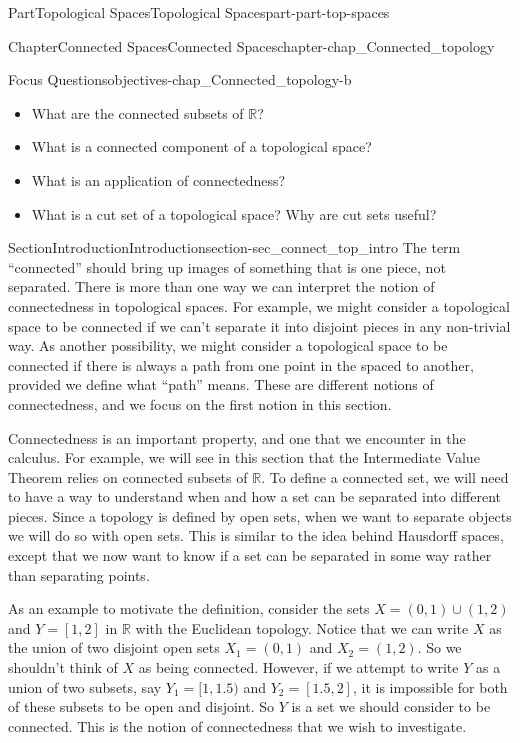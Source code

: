\documentclass[oneside,10pt,]{book}
\numberwithin{equation}{chapter}
\newcommand{\R}{\mathbb{R}}
\begin{document}
\begin{partptx}{Part}{Topological Spaces}{}{Topological Spaces}{}{}{part-part-top-spaces}
\begin{chapterptx}{Chapter}{Connected Spaces}{}{Connected Spaces}{}{}{chapter-chap_Connected_topology}
\begin{objectives}{Focus Questions}{objectives-chap_Connected_topology-b}
\begin{itemize}[label=\textbullet]
\item{}What are the connected subsets of \(\R\)?%
\item{}What is a connected component of a topological space?%
\item{}What is an application of connectedness?%
\item{}What is a cut set of a topological space? Why are cut sets useful?%
\end{itemize}
\end{objectives}
%
%
\typeout{************************************************}
\typeout{************************************************}
%
\begin{sectionptx}{Section}{Introduction}{}{Introduction}{}{}{section-sec_connect_top_intro}
The term ``connected'' should bring up images of something that is one piece, not separated. There is more than one way we can interpret the notion of connectedness in topological spaces. For example, we might consider a topological space to be connected if we can't separate it into disjoint pieces in any non-trivial way. As another possibility, we might consider a topological space to be connected if there is always a path from one point in the spaced to another, provided we define what ``path'' means. These are different notions of connectedness, and we focus on the first notion in this section.%
\par
Connectedness is an important property, and one that we encounter in the calculus. For example, we will see in this section that the Intermediate Value Theorem relies on connected subsets of \(\R\). To define a connected set, we will need to have a way to understand when and how a set can be separated into different pieces. Since a topology is defined by open sets, when we want to separate objects we will do so with open sets. This is similar to the idea behind Hausdorff spaces, except that we now want to know if a set can be separated in some way rather than separating points.%
\par
As an example to motivate the definition, consider the sets \(X = (0,1) \cup (1,2)\) and \(Y = [1,2]\) in \(\R\) with the Euclidean topology. Notice that we can write \(X\) as the union of two disjoint open sets \(X_1 = (0,1)\) and \(X_2 = (1,2)\). So we shouldn't think of \(X\) as being connected. However, if we attempt to write \(Y\) as a union of two subsets, say \(Y_1 = [1,1.5)\) and \(Y_2 = [1.5,2]\), it is impossible for both of these subsets to be open and disjoint. So \(Y\) is a set we should consider to be connected. This is the notion of connectedness that we wish to investigate.%

\end{sectionptx}
\end{chapterptx}
\end{partptx}
\end{document}
